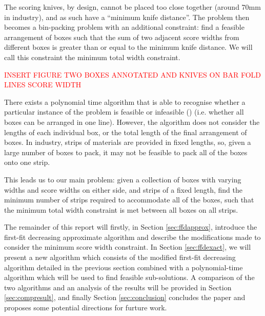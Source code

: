 \documentclass[oribibl]{llncs}
\begin{document}
The scoring knives, by design, cannot be placed too close together (around 70mm in industry), and as such have a ``minimum knife distance''. The problem then becomes a bin-packing problem with an additional constraint: find a feasible arrangement of boxes such that the sum of two adjacent score widths from different boxes is greater than or equal to the minimum knife distance. We will call this constraint the minimum total width constraint.

\textcolor{red}{INSERT FIGURE TWO BOXES ANNOTATED AND KNIVES ON BAR FOLD LINES SCORE WIDTH}

There exists a polynomial time algorithm that is able to recognise whether a particular instance of the problem is feasible or infeasible (\cite{becker2010}) (i.e. whether all boxes can be arranged in one line). However, the algorithm does not consider the lengths of each individual box, or the total length of the final arrangement of boxes. In industry, strips of materials are provided in fixed lengths, so, given a large number of boxes to pack, it may not be feasible to pack all of the boxes onto one strip. 

This leads us to our main problem: given a collection of boxes with varying widths and score widths on either side, and strips of a fixed length, find the minimum number of strips required to accommodate all of the boxes, such that the minimum total width constraint is met between all boxes on all strips. 

The remainder of this report will firstly, in Section \ref{sec:ffdapprox}, introduce the first-fit decreasing approximate algorithm and describe the modifications made to consider the minimum score width constraint. In Section \ref{sec:ffdexact}, we will present a new algorithm which consists of the modified first-fit decreasing algorithm detailed in the previous section combined with a polynomial-time algorithm which will be used to find feasible sub-solutions. A comparison of the two algorithms and an analysis of the results will be provided in Section \ref{sec:compresult}, and finally Section \ref{sec:conclusion} concludes the paper and proposes some potential directions for furture work.
\end{document}
